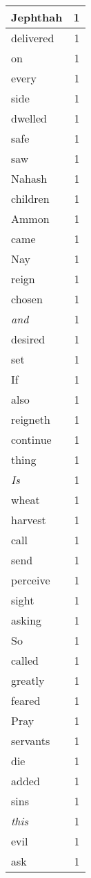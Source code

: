 \begin{center}
\begin{longtable}{l|r}
Jephthah & 1 \\ \hline
delivered & 1 \\ \hline
on & 1 \\ \hline
every & 1 \\ \hline
side & 1 \\ \hline
dwelled & 1 \\ \hline
safe & 1 \\ \hline
saw & 1 \\ \hline
Nahash & 1 \\ \hline
children & 1 \\ \hline
Ammon & 1 \\ \hline
came & 1 \\ \hline
Nay & 1 \\ \hline
reign & 1 \\ \hline
chosen & 1 \\ \hline
\emph{and} & 1 \\ \hline
desired & 1 \\ \hline
set & 1 \\ \hline
If & 1 \\ \hline
also & 1 \\ \hline
reigneth & 1 \\ \hline
continue & 1 \\ \hline
thing & 1 \\ \hline
\emph{Is} & 1 \\ \hline
wheat & 1 \\ \hline
harvest & 1 \\ \hline
call & 1 \\ \hline
send & 1 \\ \hline
perceive & 1 \\ \hline
sight & 1 \\ \hline
asking & 1 \\ \hline
So & 1 \\ \hline
called & 1 \\ \hline
greatly & 1 \\ \hline
feared & 1 \\ \hline
Pray & 1 \\ \hline
servants & 1 \\ \hline
die & 1 \\ \hline
added & 1 \\ \hline
sins & 1 \\ \hline
\emph{this} & 1 \\ \hline
evil & 1 \\ \hline
ask & 1 \\ \hline

\end{longtable}
\end{center}
